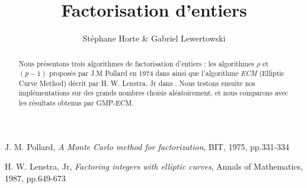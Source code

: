 \documentclass[11pt,a4paper]{article}
\title{Factorisation d'entiers}
\author{Stéphane Horte \& Gabriel Lewertowski}
\begin{document}
\maketitle

\tableofcontents

\begin{abstract}
Nous présentons trois algorithmes de factorisation d'entiers : les algorithmes \textit{$\rho$} et \textit{$(p-1)$} proposés par J.M Pollard en 1974 dans \cite{pollard_rho} ainsi que l'algorithme \textit{ECM} (Elliptic Curve Method) décrit par H. W. Lenstra, Jr dans \cite{lenstra}. Nous testons ensuite nos implémentations sur des grands nombres choisis aléatoirement, et nous comparons avec les résultats obtenus par GMP-ECM.
\end{abstract}

\begin{thebibliography}{9}
J. M. Pollard, \emph{A Monte Carlo method for factorization}, BIT, 1975, pp.331-334

H. W. Lenstra, Jr, \emph{Factoring integers with elliptic curves}, Annals of Mathematics, 1987, pp.649-673


\end{thebibliography}
\end{document}
